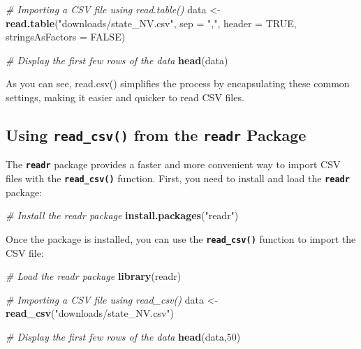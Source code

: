 \documentclass[
]{book}
\newenvironment{Shaded}{\begin{snugshade}}{\end{snugshade}}
\newcommand{\AttributeTok}[1]{\textcolor[rgb]{0.13,0.29,0.53}{#1}}
\newcommand{\CommentTok}[1]{\textcolor[rgb]{0.56,0.35,0.01}{\textit{#1}}}
\newcommand{\ConstantTok}[1]{\textcolor[rgb]{0.56,0.35,0.01}{#1}}
\newcommand{\DecValTok}[1]{\textcolor[rgb]{0.00,0.00,0.81}{#1}}
\newcommand{\FunctionTok}[1]{\textcolor[rgb]{0.13,0.29,0.53}{\textbf{#1}}}
\newcommand{\NormalTok}[1]{#1}
\newcommand{\OtherTok}[1]{\textcolor[rgb]{0.56,0.35,0.01}{#1}}
\newcommand{\StringTok}[1]{\textcolor[rgb]{0.31,0.60,0.02}{#1}}
\begin{document}
\begin{Shaded}
\begin{Highlighting}[]
\CommentTok{\# Importing a CSV file using read.table()}
\NormalTok{data }\OtherTok{\textless{}{-}} \FunctionTok{read.table}\NormalTok{(}\StringTok{"downloads/state\_NV.csv"}\NormalTok{, }\AttributeTok{sep =} \StringTok{","}\NormalTok{, }\AttributeTok{header =} \ConstantTok{TRUE}\NormalTok{, }\AttributeTok{stringsAsFactors =} \ConstantTok{FALSE}\NormalTok{)}

\CommentTok{\# Display the first few rows of the data}
\FunctionTok{head}\NormalTok{(data)}
\end{Highlighting}
\end{Shaded}

As you can see, read.csv() simplifies the process by encapsulating these common settings, making it easier and quicker to read CSV files.

\hypertarget{using-read_csv-from-the-readr-package}{%
\subsection{\texorpdfstring{Using \texttt{read\_csv()} from the \texttt{readr} Package}{Using read\_csv() from the readr Package}}\label{using-read_csv-from-the-readr-package}}

The \textbf{\texttt{readr}} package provides a faster and more convenient way to import CSV files with the \textbf{\texttt{read\_csv()}} function. First, you need to install and load the \textbf{\texttt{readr}} package:

\begin{Shaded}
\begin{Highlighting}[]
\CommentTok{\# Install the readr package}
\FunctionTok{install.packages}\NormalTok{(}\StringTok{"readr"}\NormalTok{)}
\end{Highlighting}
\end{Shaded}

Once the package is installed, you can use the \textbf{\texttt{read\_csv()}} function to import the CSV file:

\begin{Shaded}
\begin{Highlighting}[]
\CommentTok{\# Load the readr package}
\FunctionTok{library}\NormalTok{(readr)}

\CommentTok{\# Importing a CSV file using read\_csv()}
\NormalTok{data }\OtherTok{\textless{}{-}} \FunctionTok{read\_csv}\NormalTok{(}\StringTok{"downloads/state\_NV.csv"}\NormalTok{)}

\CommentTok{\# Display the first few rows of the data}
\FunctionTok{head}\NormalTok{(data,}\DecValTok{50}\NormalTok{)}
\end{Highlighting}
\end{Shaded}
\end{document}
